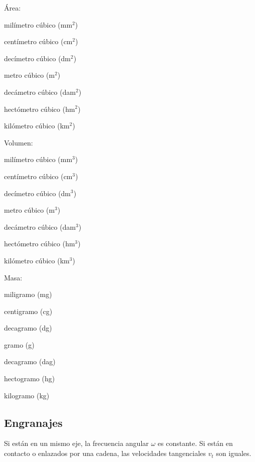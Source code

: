 \begin{multicols}{3}
Área:

milímetro cúbico (mm$^2$)

centímetro cúbico (cm$^2$)

decímetro cúbico (dm$^2$)

metro cúbico (m$^2$)

decámetro cúbico (dam$^2$)

hectómetro cúbico (hm$^2$)

kilómetro cúbico (km$^2$)

\vspace{1cm}
Volumen:

milímetro cúbico (mm$^3$)

centímetro cúbico (cm$^3$)

decímetro cúbico (dm$^3$)

metro cúbico (m$^3$)

decámetro cúbico (dam$^3$)

hectómetro cúbico (hm$^3$)

kilómetro cúbico (km$^3$)

\vspace{1cm}
Masa:

miligramo (mg)

centigramo (cg)

decagramo (dg)

gramo (g)

decagramo (dag)

hectogramo (hg)

kilogramo (kg)
\end{multicols}

\subsection*{Engranajes}

Si están en un mismo eje, la frecuencia angular $\omega$ es constante. Si están en contacto o enlazados por una cadena, las velocidades tangenciales $v_t$ son iguales.